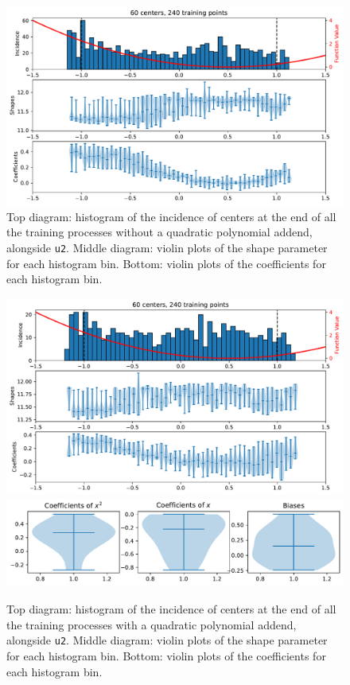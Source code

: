 \documentclass[12pt]{report} %
\begin{document}
\begin{figure}
  \includegraphics[width=\textwidth]{imagenes/experiments/1d/statistical_1d_full_scheduler_interpolation/C60-TR240-u2_poly_-1.pdf}
  \caption{Top diagram: histogram of the incidence of centers at the end of all the training processes without a quadratic polynomial addend, alongside \texttt{u2}. Middle diagram: violin plots of the shape parameter for each histogram bin. Bottom: violin plots of the coefficients for each histogram bin.}
  \label{fig:u2-results-shapes-etc-c60-tr240}
\end{figure}

\begin{figure}
  \includegraphics[width=\textwidth]{imagenes/experiments/1d/statistical_1d_full_scheduler_interpolation/C60-TR240-u2_poly_2.pdf}
  \includegraphics[width=\textwidth]{imagenes/experiments/1d/statistical_1d_full_scheduler_interpolation/C60-TR240-u2_poly_2_coefs.pdf}
  \caption{Top diagram: histogram of the incidence of centers at the end of all the training processes with a quadratic polynomial addend, alongside \texttt{u2}. Middle diagram: violin plots of the shape parameter for each histogram bin. Bottom: violin plots of the coefficients for each histogram bin.}
  \label{fig:u2-results-shapes-etc-c60-tr240-poly2}
\end{figure}
\end{document}
